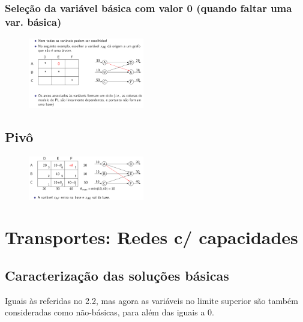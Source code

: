\documentclass[10pt, a4paper]{article}
\begin{document}
\begin{multicols}{2}
\subsubsection{Seleção da variável básica com valor 0 (quando faltar uma var. básica)}

\begin{figure}[H]
    \centering
    \includegraphics[width=0.45\textwidth]{var_basica_0.png}
\end{figure}

\subsection{Pivô}

\begin{figure}[H]
    \centering
    \includegraphics[width=0.45\textwidth]{bipartidos_pivo.png}
\end{figure}








\section{Transportes: Redes c/ capacidades}


\subsection{Caracterização das soluções básicas}

Iguais às referidas no 2.2, mas agora as variáveis no limite superior são também consideradas como não-básicas, para além das iguais a 0.


\end{multicols}
\end{document}
